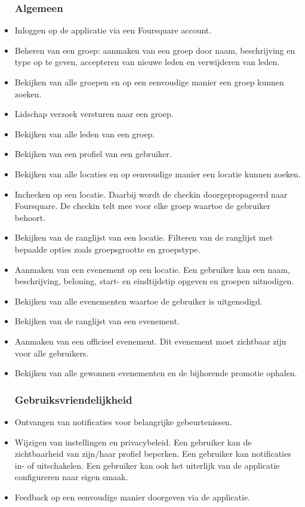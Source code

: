 \begin{itemize}
	
\subsubsection{Algemeen}
\item Inloggen op de applicatie via een Foursquare account.
\item Beheren van een groep: aanmaken van een groep door naam, beschrijving en type op te geven, accepteren van nieuwe leden en verwijderen van leden.   
\item Bekijken van alle groepen en op een eenvoudige manier een groep kunnen zoeken.
\item Lidschap verzoek versturen naar een groep.
\item Bekijken van alle leden van een groep.
\item Bekijken van een profiel van een gebruiker.
\item Bekijken van alle locaties en op eenvoudige manier een locatie kunnen zoeken.
\item Inchecken op een locatie. Daarbij wordt de checkin doorgepropageerd naar Foursquare. De checkin telt mee voor elke groep waartoe de gebruiker behoort. 
\item Bekijken van de ranglijst van een locatie. Filteren van de ranglijst met bepaalde opties zoals groepsgrootte en groepstype.
\item Aanmaken van een evenement op een locatie. Een gebruiker kan een naam, beschrijving, beloning, start- en eindtijdstip opgeven en groepen uitnodigen.
\item Bekijken van alle evenementen waartoe de gebruiker is uitgenodigd.
\item Bekijken van de ranglijst van een evenement.
\item Aanmaken van een officieel evenement. Dit evenement moet zichtbaar zijn voor alle gebruikers.
\item Bekijken van alle gewonnen evenementen en de bijhorende promotie ophalen.

\subsubsection{Gebruiksvriendelijkheid}

\item Ontvangen van notificaties voor belangrijke gebeurtenissen.
\item Wijzigen van instellingen en privacybeleid. Een gebruiker kan de zichtbaarheid van zijn/haar profiel beperken. Een gebruiker kan notificaties in- of uitschakelen. Een gebruiker kan ook het uiterlijk van de applicatie configureren naar eigen smaak.
\item Feedback op een eenvoudige manier doorgeven via de applicatie.

\end{itemize}

